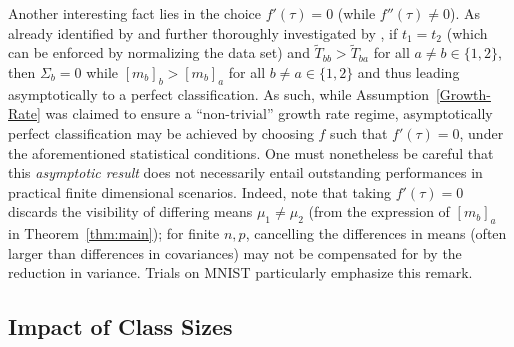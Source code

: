 \documentclass[twoside,11pt]{article}
\def\RR{\mathbb{R}}
\begin{document}

\medskip

Another interesting fact lies in the choice $f'(\tau)=0$ (while $f''(\tau)\neq 0$). As already identified by \citet{couillet2015kernel} and further thoroughly investigated by \citet{couillet2016random}, if $t_1=t_2$ (which can be enforced by normalizing the data set) and $\tilde T_{bb}>\tilde T_{ba}$ for all $a\neq b\in\{1,2\}$, then $\Sigma_b=0$ while $[m_b]_b>[m_b]_a$ for all $b\neq a\in\{1,2\}$ and thus leading asymptotically to a perfect classification.
As such, while Assumption~\ref{Growth-Rate} was claimed to ensure a ``non-trivial'' growth rate regime, asymptotically perfect classification may be achieved by choosing $f$ such that $f'(\tau)=0$, under the aforementioned statistical conditions. One must nonetheless be careful that this \textit{asymptotic result} does not necessarily entail outstanding performances in practical finite dimensional scenarios. Indeed, note that taking $f'(\tau)=0$ discards the visibility of differing means $\mu_1\neq \mu_2$ (from the expression of $[m_b]_a$ in Theorem~\ref{thm:main}); for finite $n,p$, cancelling the differences in means (often larger than differences in covariances) may not be compensated for by the reduction in variance. Trials on MNIST particularly emphasize this remark.

\subsection{Impact of Class Sizes}
\label{sec:class_size}
\end{document}
